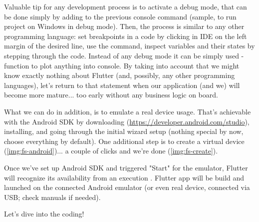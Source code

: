 
Valuable tip for any development process is to activate a debug mode, that can be done simply by adding  to 
the previous console command (sample,  to run project on Windows in debug mode). Then, 
the process is similar to any other programming language: set breakpoints in a code by clicking in IDE on the left 
margin of the desired line, use the command, inspect variables and their states by stepping through the code. Instead of
any debug mode it can be simply used -function to plot anything into console. By taking into account that we 
might know exactly nothing about Flutter (and, possibly, any other programming languages), let's return to that 
statement when our application (and we) will become more mature... too early without any business logic on board.

What we can do in addition, is to emulate a real device usage. That's achievable with the Android SDK by downloading 
(\href{https://developer.android.com/studio}{https://developer.android.com/studio}), installing, and going through 
the initial wizard setup (nothing special by now, choose everything by default). One additional step is to create a 
virtual device (\cref{img:fs-android})... a couple of clicks and we're done (\cref{img:fs-create}).

Once we've set up Android SDK and triggered "Start" for the emulator, Flutter will recognize its availability from
an execution . Flutter app will be build and launched on the connected Android emulator (or even real 
device, connected via USB; check manuals if needed).\\


\noindent Let's dive into the coding!
